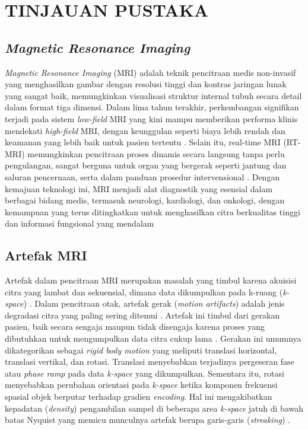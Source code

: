 \chapter{TINJAUAN PUSTAKA}


\section{\textit{Magnetic Resonance Imaging}}

\textit{Magnetic Resonance Imaging} (MRI) adalah teknik pencitraan medis non-invasif yang menghasilkan gambar dengan resolusi tinggi dan kontras jaringan lunak yang sangat baik, memungkinkan visualisasi struktur internal tubuh secara detail dalam format tiga dimensi. Dalam lima tahun terakhir, perkembangan signifikan terjadi pada sistem \textit{low-field} MRI yang kini mampu memberikan performa klinis mendekati \textit{high-field} MRI, dengan keunggulan seperti biaya lebih rendah dan keamanan yang lebih baik untuk pasien tertentu \citep{Hori2021,Huo2025}. Selain itu, real-time MRI (RT-MRI) memungkinkan pencitraan proses dinamis secara langsung tanpa perlu pengulangan, sangat berguna untuk organ yang bergerak seperti jantung dan saluran pencernaan, serta dalam panduan prosedur intervensional \citep{Nayak2022}. Dengan kemajuan teknologi ini, MRI menjadi alat diagnostik yang esensial dalam berbagai bidang medis, termasuk neurologi, kardiologi, dan onkologi, dengan kemampuan yang terus ditingkatkan untuk menghasilkan citra berkualitas tinggi dan informasi fungsional yang mendalam \citep{Hori2021,Nayak2022,Thomas2023}

\section{Artefak MRI}

Artefak dalam pencitraan MRI merupakan masalah yang timbul karena akuisisi citra yang lambat dan sekuensial, dimana data dikumpulkan pada k-ruang (\textit{k-space}) \citep{Liu2020}. Dalam pencitraan otak, artefak gerak (\textit{motion artifacts}) adalah jenis degradasi citra yang paling sering ditemui \citep{Sommer2020}. Artefak ini timbul dari gerakan pasien, baik secara sengaja maupun tidak disengaja karena proses yang dibutuhkan untuk mengumpulkan data citra cukup lama \citep{Al-masni2022}. Gerakan ini umumnya dikategorikan sebagai \textit{rigid body motion} yang meliputi translasi horizontal, translasi vertikal, dan rotasi. Translasi menyebabkan terjadinya pergeseran fase atau \textit{phase ramp} pada data \textit{k-space} yang dikumpulkan. Sementara itu, rotasi menyebabkan perubahan orientasi pada \textit{k-space} ketika komponen frekuensi spasial objek berputar terhadap gradien \textit{encoding}. Hal ini mengakibatkan kepadatan (\textit{density}) pengambilan sampel di beberapa area \textit{k-space} jatuh di bawah batas Nyquist yang memicu munculnya artefak berupa garis-garis (\textit{streaking}) \citep{Zaitsev2015}.

